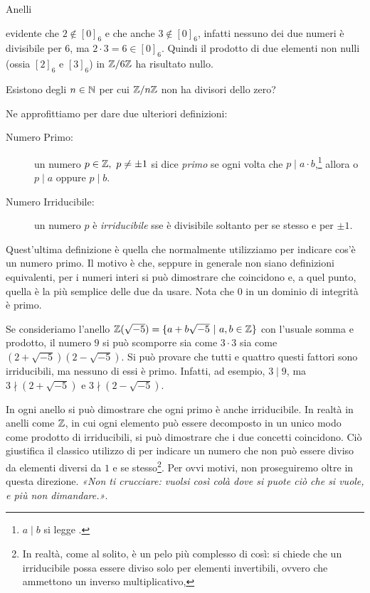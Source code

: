 \begin{subsubsection}{Anelli}
\begin{eg}
				\Egrave evidente che $2\nin[0]_6$ e che anche $3\nin[0]_6$, infatti nessuno dei due numeri è divisibile per $6$, ma $2\cdot3=6\in[0]_6$. Quindi il prodotto di due elementi non nulli (ossia $[2]_6$ e $[3]_6$) in $\mathbb{Z}/6\mathbb{Z}$ ha risultato nullo.
			\end{eg}
			\begin{es}\label{primi}
				Esistono degli $n\in\mathbb{N}$ per cui $\mathbb{Z}/n\mathbb{Z}$ non ha divisori dello zero?
			\end{es}
			\noindent Ne approfittiamo per dare due ulteriori definizioni:
			\begin{description}
				\item[Numero Primo:] un numero $p\in\mathbb{Z},\ p\neq\pm1$ si dice \emph{primo} se ogni volta che $p\mid a\cdot b$,\footnote{$a\mid b$ si legge .} allora o $p\mid a$ oppure $p\mid b$.
				\item[Numero Irriducibile:] un numero $p$ è \emph{irriducibile} sse è divisibile soltanto per se stesso e per $\pm1$.
			\end{description}
			Quest'ultima definizione è quella che normalmente utilizziamo per indicare cos'è un numero primo. Il motivo è che, seppure in generale non siano definizioni equivalenti, per i numeri interi si può dimostrare che coincidono e, a quel punto, quella  è la più semplice delle due da usare. Nota che $0$ in un dominio di integrità è primo.
			\begin{eg}
				Se consideriamo l'anello $\mathbb{Z}(\sqrt{-5})=\{a+b\sqrt{-5}\ \rvert\  a,b\in\mathbb{Z}\}$ con l'usuale somma e prodotto, il numero $9$ si può scomporre sia come $3\cdot3$ sia come $(2+\sqrt{-5})(2-\sqrt{-5})$. Si può provare che tutti e quattro questi fattori sono irriducibili, ma nessuno di essi è primo. Infatti, ad esempio, $3\mid9$, ma $3\nmid(2+\sqrt{-5})$ e $3\nmid(2-\sqrt{-5})$.
			\end{eg}
		
			In ogni anello si può dimostrare che ogni primo è anche irriducibile.
			In realtà in anelli come $\mathbb{Z}$, in cui ogni elemento può essere decomposto in un unico modo come prodotto di irriducibili, si può dimostrare che i due concetti coincidono.
			Ciò giustifica il classico utilizzo di  per indicare un numero che non può essere diviso da elementi diversi da $1$ e se stesso\footnote{In realtà, come al solito, è un pelo più complesso di così: si chiede che un irriducibile possa essere diviso solo per elementi invertibili, ovvero che ammettono un inverso multiplicativo,}. Per ovvi motivi, non proseguiremo oltre in questa direzione. \textit{«Non ti crucciare: vuolsi così colà dove si puote ciò che si vuole, e più non dimandare.»}.
			

\end{subsubsection}
